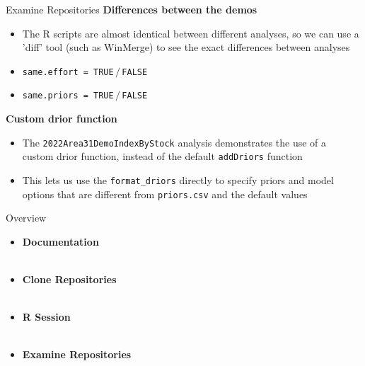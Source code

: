 \documentclass[aspectratio=169]{beamer}
\begin{document}

\begin{frame}[fragile]{Examine Repositories}
  \textbf{\darkgreen Differences between the demos}\\[0.6ex]
  \begin{itemize}
    \item[] The R scripts are almost identical between different analyses, so we
    can use a\\
    '{\darkgreen diff}' tool (such as {\darkgreen WinMerge}) to see the exact
    differences between analyses\\[1.2ex]
    \item[] {\tt {\darkgreen same.effort} = TRUE}$\,/\,${\tt FALSE}\\[0.6ex]
    \item[] {\tt {\darkgreen same.priors} = TRUE}$\,/\,${\tt FALSE}\\[0.6ex]
  \end{itemize}
  \vspace{3ex}
  \textbf{\darkgreen Custom drior function}\\[0.6ex]
  \begin{itemize}
    \item[] The {\tt 2022Area31DemoIndexByStock} analysis demonstrates the use
    of a\\
    {\darkgreen custom drior function}, instead of the default
    {\tt\darkgreen addDriors} function\\[1.5ex]
    \item[] This lets us use the \verb|format_driors| directly to specify priors
    and model options that are different from {\tt\darkgreen priors.csv} and the
    default values
  \end{itemize}
\end{frame}


\begin{frame}{Overview}
  \begin{itemize}
    \item[] {\bf\darkblue Documentation}\\[0.1ex]
    \\[3ex]
    \item[] {\bf\darkblue Clone Repositories}\\[0.1ex]
    \\[3ex]
    \item[] {\bf\darkblue R Session}\\[0.1ex]
    \\[3ex]
    \item[] {\bf\darkblue Examine Repositories}\\[0.1ex]
  \end{itemize}
\end{frame}
\end{document}
